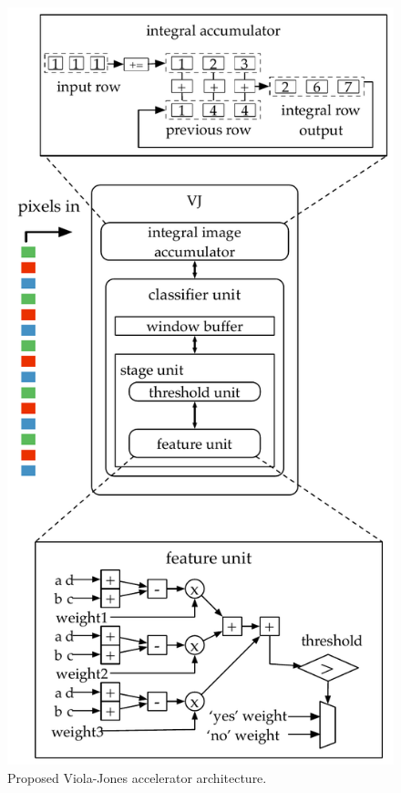 \begin{figure}
      \includegraphics[width=\textwidth]{nsp-figs/vj_arch.pdf}
    \caption{Proposed Viola-Jones accelerator architecture.}

    \label{fig:vj-block}
\end{figure}

